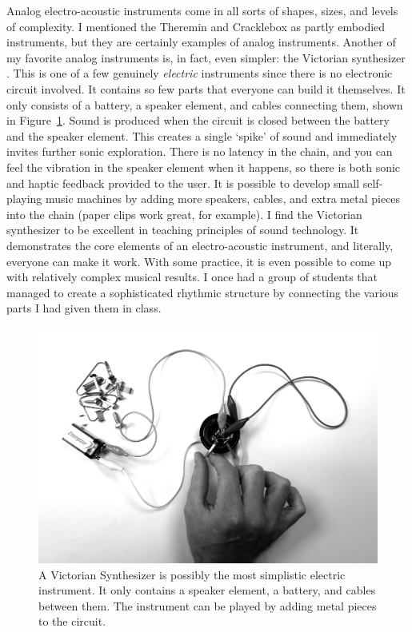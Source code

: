 Analog electro-acoustic instruments come in all sorts of shapes, sizes, and levels of complexity. I mentioned the Theremin and Cracklebox as partly embodied instruments, but they are certainly examples of analog instruments. Another of my favorite analog instruments is, in fact, even simpler: the Victorian synthesizer \citep{collins_handmade_2009}. This is one of a few genuinely \emph{electric} instruments since there is no electronic circuit involved. It contains so few parts that everyone can build it themselves. It only consists of a battery, a speaker element, and cables connecting them, shown in Figure~\ref{fig:victorian-synthesizer}. Sound is produced when the circuit is closed between the battery and the speaker element. This creates a single `spike' of sound and immediately invites further sonic exploration. There is no latency in the chain, and you can feel the vibration in the speaker element when it happens, so there is both sonic and haptic feedback provided to the user. It is possible to develop small self-playing music machines by adding more speakers, cables, and extra metal pieces into the chain (paper clips work great, for example). I find the Victorian synthesizer to be excellent in teaching principles of sound technology. It demonstrates the core elements of an electro-acoustic instrument, and literally, everyone can make it work. With some practice, it is even possible to come up with relatively complex musical results. I once had a group of students that managed to create a sophisticated rhythmic structure by connecting the various parts I had given them in class.

\begin{figure}[tbp]
	\includegraphics[width=1\columnwidth]{figures/51-victorian.jpg}
			\caption{A Victorian Synthesizer is possibly the most simplistic electric instrument. It only contains a speaker element, a battery, and cables between them. The instrument can be played by adding metal pieces to the circuit.}
			\label{fig:victorian-synthesizer}
\end{figure}


